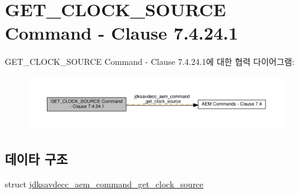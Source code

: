 \hypertarget{group__command__get__clock__source}{}\section{G\+E\+T\+\_\+\+C\+L\+O\+C\+K\+\_\+\+S\+O\+U\+R\+CE Command -\/ Clause 7.4.24.1}
\label{group__command__get__clock__source}
G\+E\+T\+\_\+\+C\+L\+O\+C\+K\+\_\+\+S\+O\+U\+R\+CE Command -\/ Clause 7.4.24.1에 대한 협력 다이어그램\+:
\nopagebreak
\begin{figure}[H]
\begin{center}
\leavevmode
\includegraphics[width=350pt]{group__command__get__clock__source}
\end{center}
\end{figure}
\subsection*{데이타 구조}
\begin{DoxyCompactItemize}
\item 
struct \hyperlink{structjdksavdecc__aem__command__get__clock__source}{jdksavdecc\+\_\+aem\+\_\+command\+\_\+get\+\_\+clock\+\_\+source}
\end{DoxyCompactItemize}
